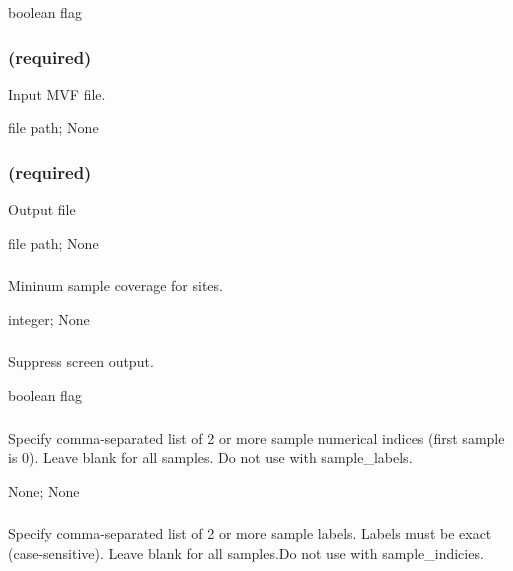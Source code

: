\documentclass[letterpaper,11pt,english]{sphinxmanual}
\begin{document}
 boolean flag


\subsubsection{ (required)}
\label{\detokenize{prog_desc:id66}}
 Input MVF file.

 file path;  None


\subsubsection{ (required)}
\label{\detokenize{prog_desc:id67}}
 Output file

 file path;  None


\subsubsection{}
\label{\detokenize{prog_desc:id68}}
 Mininum sample coverage for sites.

 integer;  None


\subsubsection{}
\label{\detokenize{prog_desc:id69}}
 Suppress screen output.

 boolean flag


\subsubsection{}
\label{\detokenize{prog_desc:id70}}
 Specify comma-separated list of 2 or more sample numerical indices (first sample is 0). Leave blank for all samples. Do not use with \textendash{}sample\_labels.

 None;  None


\subsubsection{}
\label{\detokenize{prog_desc:id71}}
 Specify comma-separated list of 2 or more sample labels. Labels must be exact (case-sensitive). Leave blank for all samples.Do not use with \textendash{}sample\_indicies.
\end{document}
